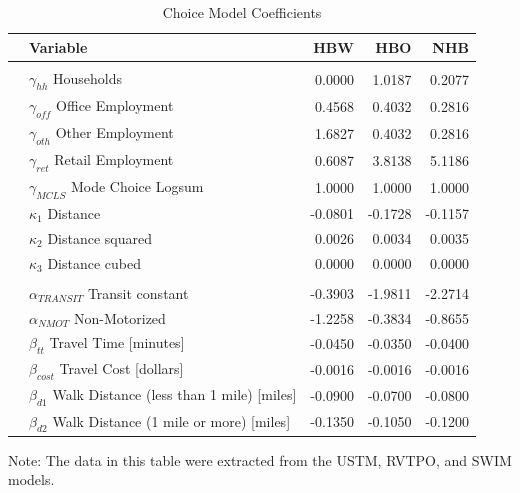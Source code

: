 \begin{table}

\caption{\label{tab:coeffs}Choice Model Coefficients}
\centering
\begin{tabular}[t]{llrrr}
\toprule
 & Variable & HBW & HBO & NHB\\
\midrule
\addlinespace[0.3em]
\multicolumn{5}{l}{\textbf{Destination Choice}}\\
\hspace{1em} & $\gamma_{hh}$ Households & 0.0000 & 1.0187 & 0.2077\\
\hspace{1em} & $\gamma_{off}$ Office Employment & 0.4568 & 0.4032 & 0.2816\\
\hspace{1em} & $\gamma_{oth}$ Other Employment & 1.6827 & 0.4032 & 0.2816\\
\hspace{1em} & $\gamma_{ret}$ Retail Employment & 0.6087 & 3.8138 & 5.1186\\
\hspace{1em} & $\gamma_{MCLS}$ Mode Choice Logsum & 1.0000 & 1.0000 & 1.0000\\
\hspace{1em} & $\kappa_1$ Distance & -0.0801 & -0.1728 & -0.1157\\
\hspace{1em} & $\kappa_2$ Distance squared & 0.0026 & 0.0034 & 0.0035\\
\hspace{1em} & $\kappa_3$ Distance cubed & 0.0000 & 0.0000 & 0.0000\\
\cmidrule{1-5}
\addlinespace[0.3em]
\multicolumn{5}{l}{\textbf{Mode Choice}}\\

\hspace{1em} & $\alpha_{TRANSIT}$ Transit constant & -0.3903 & -1.9811 & -2.2714\\
\hspace{1em} & $\alpha_{NMOT}$ Non-Motorized & -1.2258 & -0.3834 & -0.8655\\
\hspace{1em} & $\beta_{tt}$ Travel Time [minutes] & -0.0450 & -0.0350 & -0.0400\\
\hspace{1em} & $\beta_{cost}$ Travel Cost [dollars] & -0.0016 & -0.0016 & -0.0016\\
\hspace{1em} & $\beta_{d1}$ Walk Distance (less than 1 mile) [miles] & -0.0900 & -0.0700 & -0.0800\\
\hspace{1em} & $\beta_{d2}$ Walk Distance (1 mile or more) [miles] & -0.1350 & -0.1050 & -0.1200\\
\bottomrule
\end{tabular}
\begin{tablenotes}
      \small
      \item Note: The data in this table were extracted from the USTM, RVTPO, and SWIM models.
    \end{tablenotes}
\end{table}

